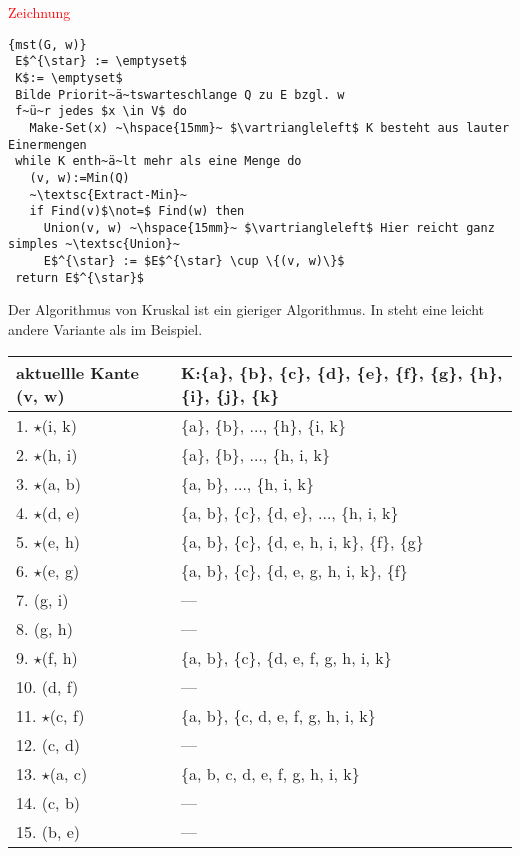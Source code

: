 \documentclass[ngerman,draft,parskip=half*,twoside]{scrreprt}
\theoremstyle{break}
\begin{document}
\textcolor{red}{Zeichnung}

\begin{Algorithmus}[H]
\begin{lstlisting}[frame=tlrb, mathescape=true, title=\textsc{mst\textnormal{(G, w)}}, gobble=1]{mst(G, w)}
 E$^{\star} := \emptyset$
 K$:= \emptyset$
 Bilde Priorit~ä~tswarteschlange Q zu E bzgl. w
 f~ü~r jedes $x \in V$ do
   Make-Set(x) ~\hspace{15mm}~ $\vartriangleleft$ K besteht aus lauter Einermengen
 while K enth~ä~lt mehr als eine Menge do
   (v, w):=Min(Q)
   ~\textsc{Extract-Min}~
   if Find(v)$\not=$ Find(w) then
     Union(v, w) ~\hspace{15mm}~ $\vartriangleleft$ Hier reicht ganz simples ~\textsc{Union}~
     E$^{\star} := $E$^{\star} \cup \{(v, w)\}$
 return E$^{\star}$   
\end{lstlisting}
Der Algorithmus von Kruskal ist ein gieriger Algorithmus. In \cite{cormen} steht eine leicht andere Variante als im
Beispiel.
\end{Algorithmus}

\begin{tabular}{|l|l|}
aktuellle Kante (v, w) & K:\{a\}, \{b\}, \{c\}, \{d\}, \{e\}, \{f\}, \{g\}, \{h\}, \{i\}, \{j\}, \{k\}\\
\hline
1.  $\star$(i, k) & \{a\}, \{b\}, $\ldots$, \{h\}, \{i, k\}\\
2.  $\star$(h, i) & \{a\}, \{b\}, $\ldots$, \{h, i, k\}\\
3.  $\star$(a, b) & \{a, b\}, $\ldots$, \{h, i, k\}\\
\hline
4.  $\star$(d, e) & \{a, b\}, \{c\}, \{d, e\}, $\ldots$, \{h, i, k\}\\
5.  $\star$(e, h) & \{a, b\}, \{c\}, \{d, e, h, i, k\}, \{f\}, \{g\}\\
6.  $\star$(e, g) & \{a, b\}, \{c\}, \{d, e, g, h, i, k\}, \{f\}\\
\hline
7.  (g, i) & ---\\
8.  (g, h) & ---\\
9.  $\star$(f, h) & \{a, b\}, \{c\}, \{d, e, f, g, h, i, k\}\\
\hline
10.  (d, f) & ---\\
11.  $\star$(c, f) & \{a, b\}, \{c, d, e, f, g, h, i, k\}\\
12.  (c, d) & ---\\
\hline
13.  $\star$(a, c) & \{a, b, c, d, e, f, g, h, i, k\}\\
14.  (c, b) & ---\\
15.  (b, e) & ---\\
\end{tabular}
\end{document}
